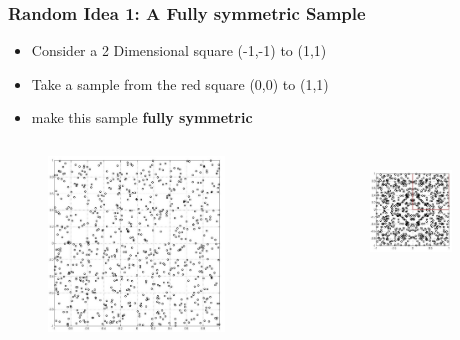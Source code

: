 \documentclass{beamer}
\begin{document}
\begin{frame}
\frametitle{Random Idea 1: A Fully symmetric Sample}

\begin{itemize}[<+->]
\item Consider a 2 Dimensional square (-1,-1) to (1,1)
\item Take a sample from the red square (0,0) to (1,1)
\item make this sample {\bf fully symmetric}
\end{itemize}

\begin{columns}[c]

   \begin{figure}[thpb]
      \centering
      \includegraphics[width=0.8\textwidth]{randunifsamples.jpg}

      \label{fig:23d4m1}
   \end{figure}

      \begin{figure}[thpb]
      \centering
       \includegraphics[width=0.8\textwidth]{fullysymsamples.jpg}
      \label{fig:23d4m1}
   \end{figure}  
   

\end{columns}
\end{frame}
\end{document}
